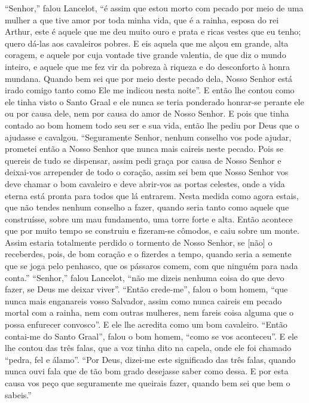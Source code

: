 “Senhor,” falou Lancelot, “é assim que estou morto com pecado por meio de uma
mulher a que tive amor por toda minha vida, que é a rainha, esposa do rei
Arthur, este é aquele que me deu muito ouro e prata e ricas vestes que eu tenho;
quero dá-las aos cavaleiros pobres. E eis aquela que me alçou em grande, alta
coragem, e aquele por cuja vontade tive grande valentia, de que diz o mundo
inteiro, e aquele que me fez vir da pobreza à riqueza e do desconforto à honra
mundana. Quando bem sei que por meio deste pecado dela, Nosso Senhor
está irado comigo tanto como Ele me indicou nesta noite”. E então lhe contou
como ele tinha visto o Santo Graal e ele nunca se teria ponderado honrar-se
perante ele ou por causa dele, nem por causa do amor de Nosso Senhor. E pois
que tinha contado ao bom homem todo seu ser e sua vida, então lhe pediu por
Deus que o ajudasse e cavalgou. “Seguramente Senhor, nenhum conselho vos pode
ajudar, prometei então a Nosso Senhor que nunca mais caireis neste pecado. Pois
se quereis de tudo se dispensar, assim pedi graça por causa de Nosso Senhor e
deixai-vos arrepender de todo o coração, assim sei bem que Nosso Senhor vos
deve chamar o bom cavaleiro e deve abrir-vos as portas celestes, onde a vida
eterna está pronta para todos que lá entrarem. Nesta medida como agora estais,
que não tendes nenhum conselho a fazer, quando seria tanto como aquele que
construísse, sobre um mau fundamento, uma torre forte e alta. Então acontece
que por muito tempo se construiu e fizeram-se cômodos, e caiu sobre um monte.
Assim estaria totalmente perdido o tormento de Nosso Senhor, se [não] o
receberdes, pois, de bom coração e o fizerdes a tempo, quando seria a semente
que se joga pelo penhasco, que os pássaros comem, com que ninguém para nada
conta.” “Senhor,” falou Lancelot, ``não me dizeis nenhuma coisa
do que devo fazer, se Deus me deixar viver”. “Então crede-me”, falou o bom
homem, “que nunca mais enganareis vosso Salvador, assim como nunca caireis em
pecado mortal com a rainha, nem com outras mulheres, nem fareis coisa alguma
que o possa enfurecer convosco”. E ele lhe acredita como um bom cavaleiro. 
“Então contai-me do Santo Graal”, falou o bom homem, “como se vos
aconteceu”. E ele lhe contou das três falas, que a voz tinha dito na capela,
onde ele foi chamado “pedra, fel e álamo”. “Por Deus, dizei-me este significado
das três falas, quando nunca ouvi fala que de tão bom grado desejasse saber
como dessa. E por esta causa vos peço que seguramente me queirais fazer, quando
bem sei que bem o sabeis.” 

